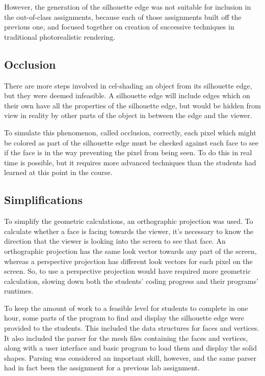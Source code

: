 \documentclass[10pt,twocolumn]{article}
\begin{document}
However, the generation of the silhouette edge was not suitable for inclusion in the out-of-class assignments, because each of those assignments built off the previous one, and focused together on creation of successive techniques in traditional photorealistic rendering.  

\subsection{Occlusion}
There are more steps involved in cel-shading an object from its silhouette edge, but they were deemed infeasible.  A silhouette edge will include edges which on their own have all the properties of the silhouette edge, but would be hidden from view in reality by other parts of the object in between the edge and the viewer.  

To simulate this phenomenon, called occlusion, correctly, each pixel which might be colored as part of the silhouette edge must be checked against each face to see if the face is in the way preventing the pixel from being seen.  To do this in real time is possible, but it requires more advanced techniques than the students had learned at this point in the course.  

\subsection{Simplifications}
To simplify the geometric calculations, an orthographic projection was used.  
To calculate whether a face is facing towards the viewer, it's necessary to know the direction that the viewer is looking into the screen to see that face.  An orthographic projection has the same look vector towards any part of the screen, whereas a perspective projection has different look vectors for each pixel on the screen.  So, to use a perspective projection would have required more geometric calculation, slowing down both the students' coding progress and their programs' runtimes.  

To keep the amount of work to a feasible level for students to complete in one hour, some parts of the program to find and display the silhouette edge were provided to the students.  This included the data structures for faces and vertices.  It also included the parser for the mesh files containing the faces and vertices, along with a user interface and basic program to load them and display the solid shapes.  Parsing was considered an important skill, however, and the same parser had in fact been the assignment for a previous lab assignment.  
\end{document}
